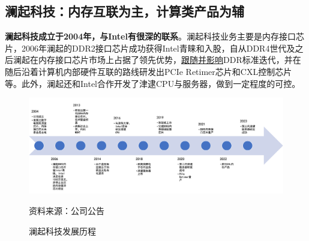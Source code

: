 \documentclass[a4paper,12pt]{ctexart}
\begin{document}
\subsection{澜起科技：内存互联为主，计算类产品为辅}
\textbf{澜起科技成立于2004年，与Intel有很深的联系}。澜起科技业务主要是内存接口芯片，2006年澜起的DDR2接口芯片成功获得Intel青睐和入股，自从DDR4世代及之后澜起在内存接口芯片市场上占据了领先优势，\uline{跟随并影响}DDR标准迭代，并在随后沿着计算机内部硬件互联的路线研发出PCIe Retimer芯片和CXL控制芯片等。此外，澜起还和Intel合作开发了津逮CPU与服务器，做到一定程度的可控。
\begin{figure}[H]
    {\centering
        \caption{澜起科技发展历程}
        \includegraphics[width=\linewidth]{img/history-lq.png}
        \par}
    \footnotesize{资料来源：公司公告}
\end{figure}
\end{document}
